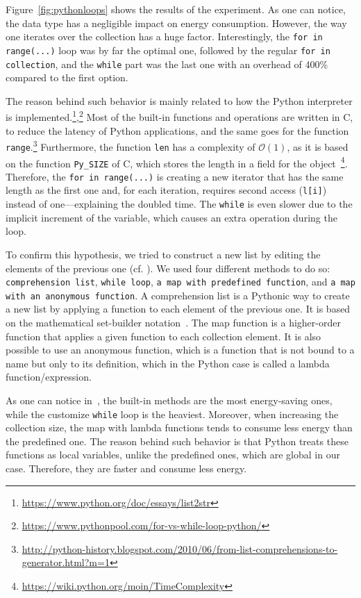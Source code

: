 Figure~\ref{fig:pythonloops} shows the results of the experiment.
As one can notice, the data type has a negligible impact on energy consumption.
However, the way one iterates over the collection has a huge factor.
Interestingly, the \texttt{for in range(...)} loop was by far the optimal one, followed by the regular \texttt{for in collection}, and the \texttt{while} part was the last one with an overhead of 400\% compared to the first option.

The reason behind such behavior is mainly related to how the Python interpreter is implemented.\footnote{\url{https://www.python.org/doc/essays/list2str}},\footnote{\url{https://www.pythonpool.com/for-vs-while-loop-python/}}
Most of the built-in functions and operations are written in C, to reduce the latency of Python applications, and the same goes for the function \texttt{range}.\footnote{\url{ http://python-history.blogspot.com/2010/06/from-list-comprehensions-to-generator.html?m=1}}
Furthermore, the function \texttt{len} has a complexity of $\mathcal{O}(1)$, as it is based on the function \texttt{Py\_SIZE} of C, which stores the length in a field for the object~\footnote{\url{https://wiki.python.org/moin/TimeComplexity}}.
Therefore, the \texttt{for in range(...)} is creating a new iterator that has the same length as the first one and, for each iteration, requires second access (\texttt{l[i]}) instead of one---explaining the doubled time.
The \texttt{while} is even slower due to the implicit increment of the variable, which causes an extra operation during the loop.

To confirm this hypothesis, we tried to construct a new list by editing the elements of the previous one (cf. ).
We used four different methods to do so: \texttt{comprehension list}, \texttt{while loop}, \texttt{a map with predefined function}, and \texttt{a map with an anonymous function}.
A comprehension list is a Pythonic way to create a new list by applying a function to each element of the previous one.
It is based on the mathematical set-builder notation~\cite{editiondiscrete}.
The map function is a higher-order function that applies a given function to each collection element.
It is also possible to use an anonymous function, which is a function that is not bound to a name but only to its definition, which in the Python case is called a lambda function/expression.

As one can notice in~, the built-in methods are the most energy-saving ones, while the customize \texttt{while} loop is the heaviest.
Moreover, when increasing the collection size, the map with lambda functions tends to consume less energy than the predefined one.
The reason behind such behavior is that Python treats these functions as local variables, unlike the predefined ones, which are global in our case.
Therefore, they are faster and consume less energy.

